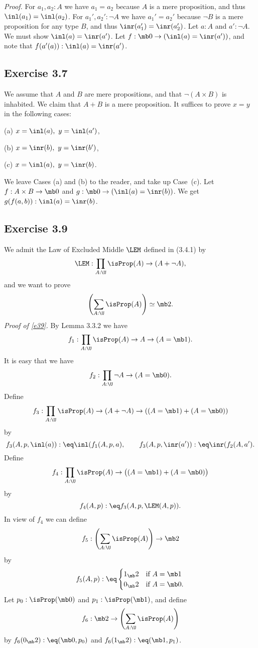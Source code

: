 \documentclass[12pt]{article}
\begin{document}
\nn\emph{Proof.} For $a_1,a_2:A$ we have $a_1=a_2$ because $A$ is a mere proposition, and thus $\inl(a_1)=\inl(a_2)$. For $a_1',a_2':\neg A$ we have $a_1'=a_2'$ because $\neg B$ is a mere proposition for any type $B$, and thus $\inr(a_1')=\inr(a_2')$. Let $a:A$ and $a':\neg A$. We must show $\inl(a)=\inr(a')$. Let $f:\mb0\to(\inl(a)=\inr(a'))$, and note that $f(a'(a)):\inl(a)=\inr(a')$.


\subsection{Exercise 3.7}

We assume that $A$ and $B$ are mere propositions, and that $\neg(A\times B)$ is inhabited. We claim that $A+B$ is a mere proposition. It suffices to prove $x=y$ in the following cases:

(a) $x=\inl(a),\ y=\inl(a')$,

(b) $x=\inr(b),\ y=\inr(b')$,

(c) $x=\inl(a),\ y=\inr(b)$.

\nn We leave Cases (a) and (b) to the reader, and take up Case~(c). Let $f:A\times B\to\mb0$ and $g:\mb0\to(\inl(a)=\inr(b))$. We get $g(f(a,b)):\inl(a)=\inr(b)$.


\subsection{Exercise 3.9}

We admit the Law of Excluded Middle $\LEM$ defined in (3.4.1) by 
$$
\LEM:\prod_{A:\U}\isProp(A)\to(A+\neg A),
$$ 
and we want to prove 
\begin{equation}\label{e39}
\left(\sum_{A:\U}\isProp(A)\right)\simeq\mb2.
\end{equation}
\emph{Proof of \eqref{e39}.} By Lemma 3.3.2 we have 
$$
f_1:\prod_{A:\U}\isProp(A)\to A\to(A=\mb1). 
$$ 
It is easy that we have 
$$
f_2:\prod_{A:\U}\neg A\to(A=\mb0). 
$$ 
Define 
$$
f_3:\prod_{A:\U}\isProp(A)\to(A+\neg A)\to((A=\mb1)+(A=\mb0))
$$ 
by 
$$
f_3(A,p,\inl(a)):\eq\inl(f_1(A,p,a),\qquad f_3(A,p,\inr(a')):\eq\inr(f_2(A,a').
$$ 
Define 
$$
f_4:\prod_{A:\U}\isProp(A)\to\big((A=\mb1)+(A=\mb0)\big)
$$ 
by 
$$
f_4(A,p):\eq f_3(A,p,\LEM(A,p)).
$$ 
In view of $f_4$ we can define 
$$
f_5:\left(\sum_{A:\U}\isProp(A)\right)\to\mb2
$$ 
by 
$$
f_5(A,p):\eq
\begin{cases}
1_\mb2&\text{if }A=\mb1\\
0_\mb2&\text{if }A=\mb0.
\end{cases}
$$ 
Let $p_0:\isProp(\mb0)$ and $p_1:\isProp(\mb1)$, and define 
$$
f_6:\mb2\to\left(\sum_{A:\U}\isProp(A)\right)
$$ 
by $f_6(0_\mb2):\eq(\mb0,p_0)$ and $f_6(1_\mb2):\eq(\mb1,p_1)$.
\end{document}
